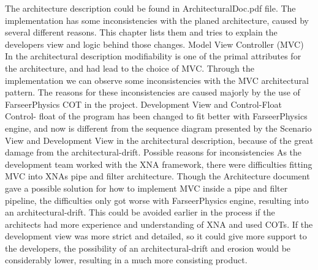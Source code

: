 The architecture description could be found in ArchitecturalDoc.pdf file. The implementation has some inconsistencies with the planed architecture, caused by several different reasons. This chapter lists them and tries to explain the developers view and logic behind those changes.
Model View Controller (MVC)
In the architectural description modifiability is one of the primal attributes for the architecture, and had lead to the choice of MVC. Through the implementation we can observe some inconsistencies with the MVC architectural pattern. The reasons for these inconsistencies are caused majorly by the use of FarseerPhysics COT in the project.
Development View and Control-Float
Control- float of the program has been changed to fit better with FarseerPhysics engine, and now is different from the sequence diagram presented by the Scenario View and Development View in the architectural description, because of the great damage from the architectural-drift.
Possible reasons for inconsistencies
As the development team worked with the XNA framework, there were difficulties fitting MVC into XNAs pipe and filter architecture. Though the Architecture document gave a possible solution for how to implement MVC inside a pipe and filter pipeline, the difficulties only got worse with FarseerPhysics engine, resulting into an architectural-drift. This could be avoided earlier in the process if the architects had more experience and understanding of XNA and used COTs. If the development view was more strict and detailed, so it could give more support to the developers, the possibility of an architectural-drift and erosion would be considerably lower, resulting in a much more consisting product.